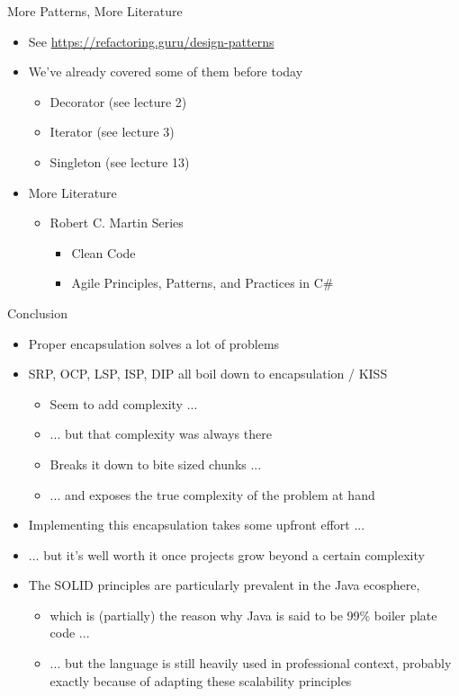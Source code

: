 
\begin{frame}{More Patterns, More Literature}
%
\begin{itemize}
\item See \url{https://refactoring.guru/design-patterns}
\item We've already covered some of them before today
	\begin{itemize}
	\item Decorator (see lecture 2)
	\item Iterator (see lecture 3)
	\item Singleton (see lecture 13)
	\end{itemize}
\item More Literature
	\begin{itemize}
	\item Robert C. Martin Series
		\begin{itemize}
		\item Clean Code
		\item Agile Principles, Patterns, and Practices in C\#
		\end{itemize}
	\end{itemize}
\end{itemize}
%
\end{frame}


\begin{frame}{Conclusion}
%
\begin{itemize}
\item Proper encapsulation solves a lot of problems
\item SRP, OCP, LSP, ISP, DIP all boil down to encapsulation / KISS
	\begin{itemize}
	\item Seem to add complexity ...
	\item ... but that complexity was always there
	\item Breaks it down to bite sized chunks ...
	\item ... and exposes the true complexity of the problem at hand
	\end{itemize}
\item Implementing this encapsulation takes some upfront effort ...
\item ... but it's well worth it once projects grow beyond a certain complexity
\pause
\item The SOLID principles are particularly prevalent in the Java ecosphere,
	\begin{itemize}
	\item which is (partially) the reason why Java is said to be 99\% boiler plate code ...
	\item ... but the language is still heavily used in professional context, probably exactly because of adapting these scalability principles
	\end{itemize}
\end{itemize}
%
\end{frame}


